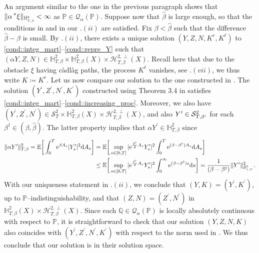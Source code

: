 \documentclass[10pt]{article} %
\newcommand\cH{\mathcal H}
\newcommand\cQ{\mathcal Q}
\newcommand\cS{\mathcal S}
\newcommand{\smalltext}[1]{\text{\fontsize{4}{4}\selectfont$#1$}}
\def \E{\mathbb{E}}
\def \H{\mathbb{H}}
\def \P{\mathbb{P}}
\def \Q{\mathbb{Q}}
\newcommand{\brs}[1]{\prescript{\ast}{}{#1}}
\def\d{\mathrm{d}}
\begin{document}
An argument similar to the one in the previous paragraph shows that $\|\alpha\brs{\xi}\|_{\H^\smalltext{2}_{\smalltext{T}\smalltext{,}\smalltext{\hat\beta}}} < \infty$ as $\P \in \cQ_\alpha(\P)$. Suppose now that $\hat\beta$ is large enough, so that the conditions in \cite[Theorem 3.9]{lin2020second} and in our .$(ii)$ are satisfied. Fix $\beta < \hat\beta$ such that the difference $\hat\beta-\beta$ is small. By .$(ii)$, there exists a unique solution $(Y,Z,N,K^r,K^\ell)$ to \ref{cond::integ_mart}--\ref{cond::repre_Y} such that $(\alpha Y,Z,N) \in \H^2_{T,\beta} \times \H^2_{T,\beta}(X) \times \cH^{2,\perp}_{T,\beta}(X)$. Recall here that due to the obstacle $\xi$ having c\`adl\`ag paths, the process $K^\ell$ vanishes, see .$(vii)$, we thus write $K \coloneqq K^r$. Let us now compare our solution to the one constructed in \cite{lin2020second}. The solution $(Y^\prime,Z^\prime,N^\prime,K^\prime)$ constructed using Theorem 3.4 in \cite{lin2020second} satisfies \ref{cond::integ_mart}--\ref{cond::increasing_proc}. Moreover, we also have $(Y^\prime,Z^\prime,N^\prime) \in \cS^2_T \times \H^2_{T,\beta}(X) \times \cH^{2,\perp}_{T,\beta}(X)$, and also $Y^\prime \in \cS^2_{T,\beta^\smalltext{\dag}}$ for each $\beta^\dag \in (\beta,\hat\beta)$. The latter property implies that $\alpha Y^\prime \in \H^2_{T,\beta}$ since
\begin{align*}
	\|\alpha Y^\prime\|^2_{T,\beta} = \E\bigg[\int_0^T \mathrm{e}^{\beta A_s} |Y^\prime_s|^2 \d A_s\bigg] &= \E\bigg[\sup_{s \in [0,T]}|\mathrm{e}^{\frac{\beta^\smalltext{\dag}}{2} A_s}Y^\prime_s|^2 \int_0^T \mathrm{e}^{(\beta-\beta^\dag)A_s} \d A_s\bigg] \\
	&\leq \E\bigg[\sup_{s \in [0,T]}|\mathrm{e}^{\frac{\beta^\smalltext{\dag}}{2} A_s}Y^\prime_s|^2 \int_0^\infty \mathrm{e}^{(\beta-\beta^\dag)s} \d s\bigg] = \frac{1}{(\beta-\beta^\dag)} \|Y^\prime\|^2_{\cS^\smalltext{2}_{\smalltext{T}\smalltext{,}\smalltext{\beta^\dag}}}.
\end{align*}
With our uniqueness statement in .$(ii)$, we conclude that $(Y,K) = (Y^\prime,K^\prime)$, up to $\P$--indistinguishability, and that $(Z,N) = (Z^\prime,N^\prime)$ in $\H^2_{T,\beta}(X) \times \cH^{2,\perp}_{T,\beta}(X)$. Since each $\Q \in \cQ_\alpha(\P)$ is locally absolutely continuous with respect to $\P$, it is straightforward to check that our solution $(Y,Z,N,K)$ also coincides with $(Y^\prime,Z^\prime,N^\prime,K^\prime)$ with respect to the norm used in \cite{lin2020second}. We thus conclude that our solution is in their solution space.
\end{document}
